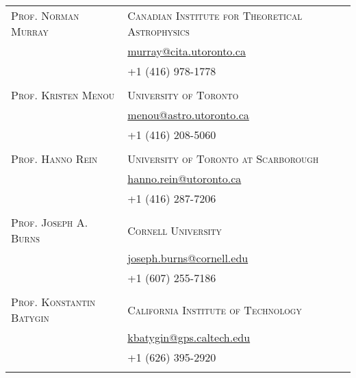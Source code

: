 \documentclass[10pt]{article} %
\begin{document}
\begin{tabular}{l|ll}
\textsc{Prof. Norman Murray} & \textsc{Canadian Institute for Theoretical Astrophysics} \\
& \href{mailto:murray@cita.utoronto.ca}{murray@cita.utoronto.ca} \\
& +1 (416) 978-1778 \\
\\

\textsc{Prof. Kristen Menou} &  \textsc{University of Toronto} \\
&\href{mailto:menou@astro.utoronto.ca}{menou@astro.utoronto.ca} \\
& +1 (416) 208-5060 \\
\\

\textsc{Prof. Hanno Rein} &  \textsc{University of Toronto at Scarborough} \\
&\href{mailto:menou@astro.utoronto.ca}{hanno.rein@utoronto.ca} \\
& +1 (416) 287-7206 \\
\\

\textsc{Prof. Joseph A. Burns} & \textsc{Cornell University} \\
& \href{mailto:joseph.burns@cornell.edu}{joseph.burns@cornell.edu} \\ 
& +1 (607) 255-7186 \\
\\

\textsc{Prof. Konstantin Batygin} &  \textsc{California Institute of Technology} \\
& \href{mailto:kbatygin@gps.caltech.edu}{kbatygin@gps.caltech.edu} \\
& +1 (626) 395-2920 \\
\\

\end{tabular}
\end{document}
